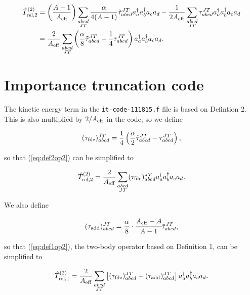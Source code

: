 \documentclass{article}
\begin{document}
\begin{equation}\label{eq:def2op2}
  \begin{aligned}
    \hat{T}_{\rm{rel},2}^{(2)} &= \left(\frac{A-1}{A_{\rm{eff}}}\right)
    \displaystyle\sum_{\substack{abcd\\JT}} \frac{\alpha}{4(A-1)}
    \tilde{\tau}_{abcd}^{JT} a_a^{\dagger}a_b^{\dagger}a_ca_d
    -\frac{1}{2A_{\rm{eff}}} \displaystyle\sum_{\substack{abcd\\JT}}
    \tau_{abcd}^{JT} a_a^{\dagger}a_b^{\dagger}a_ca_d\\
    &= \frac{2}{A_{\rm{eff}}} \displaystyle\sum_{\substack{abcd\\JT}}
    \left( \frac{\alpha}{8}\tilde{\tau}_{abcd}^{JT}
    -\frac{1}{4}\tau_{abcd}^{JT} \right) a_a^{\dagger}a_b^{\dagger}a_ca_d.
  \end{aligned}
\end{equation}

\section{Importance truncation code}

The kinetic energy term in the \texttt{it-code-111815.f} file is based
on Defintion 2. This is also multiplied by $2/A_{\rm{eff}}$ in the
code, so we define

\begin{equation}
  (\tau_{\rm{file}})_{abcd}^{JT} = \frac{1}{4}
  \left( \frac{\alpha}{2} \tilde{\tau}_{abcd}^{JT} - \tau_{abcd}^{JT}
  \right),
\end{equation}

so that (\ref{eq:def2op2}) can be simplified to

\begin{equation}
  \hat{T}_{\rm{rel},2}^{(2)} = \frac{2}{A_{\rm{eff}}}
  \displaystyle\sum_{\substack{abcd\\JT}} (\tau_{\rm{file}})_{abcd}^{JT}
  a_a^{\dagger}a_b^{\dagger}a_ca_d.
\end{equation}

We also define

\begin{equation}
  (\tau_{\rm{add}})_{abcd}^{JT} = \frac{\alpha}{8}\cdot
  \cfrac{A_{\rm{eff}}-A}{A-1}
  \tilde{\tau}_{abcd}^{JT},
\end{equation}

so that (\ref{eq:def1op2}), the two-body operator based on
Definition 1, can be simplified to

\begin{equation}
  \hat{T}_{\rm{rel},1}^{(2)} = \frac{2}{A_{\rm{eff}}}
  \displaystyle\sum_{\substack{abcd\\JT}} \left[ 
  (\tau_{\rm{file}})_{abcd}^{JT} + (\tau_{\rm{add}})_{abcd}^{JT}
  \right] a_a^{\dagger}a_b^{\dagger}a_ca_d.
\end{equation}
\end{document}
